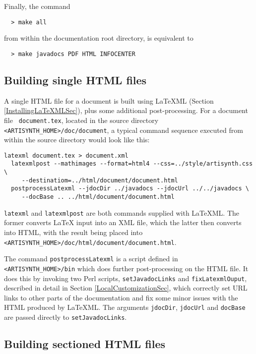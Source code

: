 \documentclass{article}
\begin{document}
Finally, the command
%
\begin{verbatim}
  > make all
\end{verbatim}
%
from within the documentation root directory, is
equivalent to 
%
\begin{verbatim}
  > make javadocs PDF HTML INFOCENTER
\end{verbatim}
%

\subsection{Building single HTML files}
\label{BuildingSingleHTMLSec}

A single HTML file for a document is built
using LaTeXML (Section \ref{InstallingLaTeXMLSec}), plus some
additional post-processing. For a document file {\tt
document.tex}, located in the source directory {\tt
<ARTISYNTH\_HOME>/doc/document}, a typical command sequence 
executed from within the source directory would look like this:

\begin{lstlisting}[]
  latexml document.tex > document.xml
  latexmlpost --mathimages --format=html4 --css=../style/artisynth.css \
     --destinatiom=../html/document/document.html
  postprocessLatexml --jdocDir ../javadocs --jdocUrl ../../javadocs \
     --docBase .. ../html/document/document.html
\end{lstlisting}

{\tt latexml} and {\tt latexmlpost} are both commands supplied with
LaTeXML. The former converts LaTeX input into an XML file, which the
latter then converts into HTML, with the result being placed into {\tt
<ARTISYNTH\_HOME>/doc/html/document/document.html}.

The command {\tt postprocessLatexml} is a script defined in {\tt
<ARTISYNTH\_HOME>/bin} which does further post-processing on the HTML
file. It does this by invoking two Perl scripts, {\tt setJavadocLinks}
and {\tt fixLatexmlOuput}, described in detail in Section
\ref{LocalCustomizationSec}, which correctly set URL links to other
parts of the documentation and fix some minor issues with the HTML
produced by LaTeXML. The arguments {\tt \DHY jdocDir}, {\tt \DHY jdocUrl}
and {\tt \DHY docBase} are passed directly to {\tt setJavadocLinks}.

\subsection{Building sectioned HTML files}
\label{BuildingSectionedHTMLSec}
\end{document}
